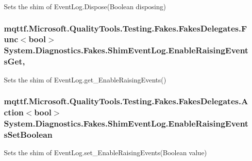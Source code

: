Sets the shim of Event\-Log.\-Dispose(\-Boolean disposing)

\hypertarget{class_system_1_1_diagnostics_1_1_fakes_1_1_shim_event_log_a15567f4ae93ce9c30d331100a84a88e8}{
\subsubsection[{Enable\-Raising\-Events\-Get}]{\setlength{\rightskip}{0pt plus 5cm}mqttf.\-Microsoft.\-Quality\-Tools.\-Testing.\-Fakes.\-Fakes\-Delegates.\-Func$<$bool$>$ System.\-Diagnostics.\-Fakes.\-Shim\-Event\-Log.\-Enable\-Raising\-Events\-Get\hspace{0.3cm}{\ttfamily [get]}, {\ttfamily [set]}}}\label{class_system_1_1_diagnostics_1_1_fakes_1_1_shim_event_log_a15567f4ae93ce9c30d331100a84a88e8}


Sets the shim of Event\-Log.\-get\-\_\-\-Enable\-Raising\-Events()

\hypertarget{class_system_1_1_diagnostics_1_1_fakes_1_1_shim_event_log_a6acbcd5f6b3f8d137733f94f17240225}{
\subsubsection[{Enable\-Raising\-Events\-Set\-Boolean}]{\setlength{\rightskip}{0pt plus 5cm}mqttf.\-Microsoft.\-Quality\-Tools.\-Testing.\-Fakes.\-Fakes\-Delegates.\-Action$<$bool$>$ System.\-Diagnostics.\-Fakes.\-Shim\-Event\-Log.\-Enable\-Raising\-Events\-Set\-Boolean\hspace{0.3cm}{\ttfamily [set]}}}\label{class_system_1_1_diagnostics_1_1_fakes_1_1_shim_event_log_a6acbcd5f6b3f8d137733f94f17240225}


Sets the shim of Event\-Log.\-set\-\_\-\-Enable\-Raising\-Events(\-Boolean value)

